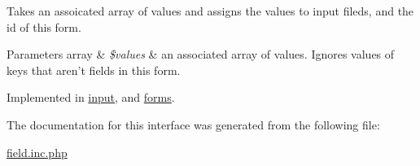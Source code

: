 Takes an assoicated array of values and assigns the values to input fileds, and the id of this form. 


\begin{DoxyParams}[1]{Parameters}
array & {\em \$values} & an associated array of values. Ignores values of keys that aren't fields in this form. \\
\hline
\end{DoxyParams}


Implemented in \hyperlink{classinput_a78f0cd122c69a6f62875152c0cfc9bc2}{input}, and \hyperlink{classforms_ad66e3f3a4d5332bbd15e53680930d786}{forms}.



The documentation for this interface was generated from the following file\-:\begin{DoxyCompactItemize}
\item 
\hyperlink{field_8inc_8php}{field.\-inc.\-php}\end{DoxyCompactItemize}
